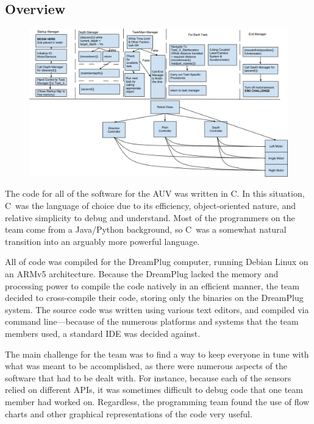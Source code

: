 \documentclass[12pt, letterpaper, twocolumn, titlepage]{article}
\newcommand{\CPP}
{C\nolinebreak[4]\hspace{-.05em}\raisebox{.22ex}{\footnotesize\bf ++}}
\begin{document}
\subsection{Overview}
\begin{figure}[b!]
   \vspace{-10pt}
   \flushright
      \includegraphics[width=\textwidth]{Flowchart}
      \vspace{-10pt}
\end{figure}

The code for all of the software for the AUV was written in \CPP. In this situation, \CPP\ was the language of choice due to its efficiency, object-oriented nature, and relative simplicity to debug and understand. Most of the programmers on the team come from a Java/Python background, so \CPP\ was a somewhat natural transition into an arguably more powerful language.

All of code was compiled for the DreamPlug computer, running Debian Linux on an ARMv5 architecture. Because the DreamPlug lacked the memory and processing power to compile the code natively in an efficient manner, the team decided to cross-compile their code, storing only the binaries on the DreamPlug system. The source code was written using various text editors, and compiled via command line---because of the numerous platforms and systems that the team members used, a standard IDE was decided against.

The main challenge for the team was to find a way to keep everyone in tune with what was meant to be accomplished, as there were numerous aspects of the software that had to be dealt with. For instance, because each of the sensors relied on different APIs, it was sometimes difficult to debug code that one team member had worked on. Regardless, the programming team found the use of flow charts and other graphical representations of the code very useful.
\end{document}

